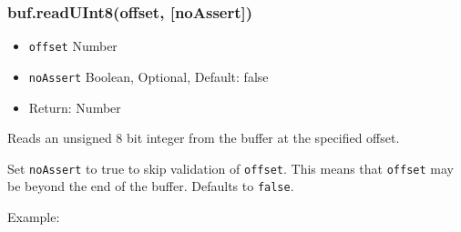 \begin{Shaded}
\begin{Highlighting}[]
  \NormalTok{(}\NormalTok{);}

 \NormalTok{(}   
  \NormalTok{; }
\NormalTok{\}}

 \NormalTok{(}\NormalTok{, }\NormalTok{);}
\NormalTok{(}\NormalTok{(}\NormalTok{, }\NormalTok{, }\NormalTok{));}
\NormalTok{buf1[}\NormalTok{] = }\NormalTok{;}
\NormalTok{(}\NormalTok{(}\NormalTok{, }\NormalTok{, }\NormalTok{));}

\end{Highlighting}
\end{Shaded}

\subsubsection{buf.readUInt8(offset,
{[}noAssert{]})}\label{buf.readuint8offset-noassert}

\begin{itemize}
\itemsep1pt\parskip0pt
\item
  \texttt{offset} Number
\item
  \texttt{noAssert} Boolean, Optional, Default: false
\item
  Return: Number
\end{itemize}

Reads an unsigned 8 bit integer from the buffer at the specified offset.

Set \texttt{noAssert} to true to skip validation of \texttt{offset}.
This means that \texttt{offset} may be beyond the end of the buffer.
Defaults to \texttt{false}.

Example:

